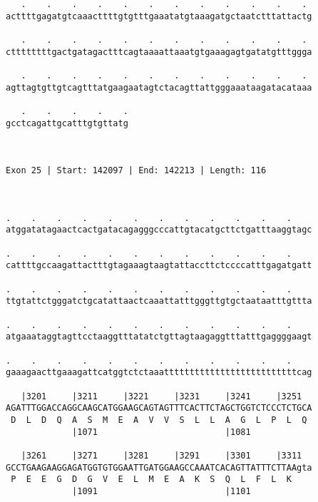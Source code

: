 \documentclass{article}
\begin{document}
\begin{Verbatim}
   .    .    .    .    .    .    .    .    .    .    .    . 
acttttgagatgtcaaacttttgtgtttgaaatatgtaaagatgctaatctttattactg
                                                            
   .    .    .    .    .    .    .    .    .    .    .    . 
cttttttttgactgatagactttcagtaaaattaaatgtgaaagagtgatatgtttggga
                                                            
   .    .    .    .    .    .    .    .    .    .    .    . 
agttagtgttgtcagtttatgaagaatagtctacagttattgggaaataagatacataaa
                                                            
   .    .    .    .    .
gcctcagattgcatttgtgttatg
                        
                        
 
Exon 25 | Start: 142097 | End: 142213 | Length: 116



.    .    .    .    .    .    .    .    .    .    .    .    
atggatatagaactcactgatacagagggcccattgtacatgcttctgatttaaggtagc
                                                            
.    .    .    .    .    .    .    .    .    .    .    .    
cattttgccaagattactttgtagaaagtaagtattaccttctccccatttgagatgatt
                                                            
.    .    .    .    .    .    .    .    .    .    .    .    
ttgtattctgggatctgcatattaactcaaattatttgggttgtgctaataatttgttta
                                                            
.    .    .    .    .    .    .    .    .    .    .    .    
atgaaataggtagttcctaaggtttatatctgttagtaagaggtttatttgaggggaagt
                                                            
.    .    .    .    .    .    .    .    .    .    .    .    
gaaagaacttgaaagattcatggtctctaaattttttttttttttttttttttttttcag
                                                            
   |3201     |3211     |3221     |3231     |3241     |3251  
AGATTTGGACCAGGCAAGCATGGAAGCAGTAGTTTCACTTCTAGCTGGTCTCCCTCTGCA
 D  L  D  Q  A  S  M  E  A  V  V  S  L  L  A  G  L  P  L  Q 
             |1071                         |1081            
  
   |3261     |3271     |3281     |3291     |3301     |3311  
GCCTGAAGAAGGAGATGGTGTGGAATTGATGGAAGCCAAATCACAGTTATTTCTTAAgta
 P  E  E  G  D  G  V  E  L  M  E  A  K  S  Q  L  F  L  K    
             |1091                         |1101            
  

\end{Verbatim}
\end{document}
